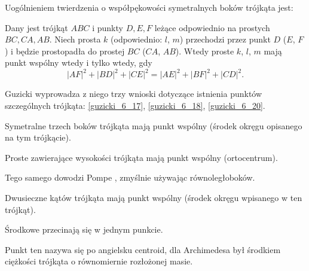 %

Uogólnieniem twierdzenia o współpękowości symetralnych boków trójkąta jest:

\begin{proposition}
\label{guzicki_6_13}%
	Dany jest trójkąt $ABC$ i punkty $D, E, F$ leżące odpowiednio na prostych $BC, CA, AB$.
	Niech prosta $k$ (odpowiednio: $l$, $m$) przechodzi przez punkt $D$ ($E$, $F$) i będzie prostopadła do prostej $BC$ ($CA$, $AB$).
	Wtedy proste $k$, $l$, $m$ mają punkt wspólny wtedy i tylko wtedy, gdy
	\begin{equation}
		|AF|^2 + |BD|^2 + |CE|^2 = |AE|^2 + |BF|^2 + |CD|^2.
	\end{equation}
\end{proposition}

Guzicki \cite[s. 176]{guzicki_2021} wyprowadza z niego trzy wnioski dotyczące istnienia punktów szczególnych trójkąta: \ref{guzicki_6_17}, \ref{guzicki_6_18}, \ref{guzicki_6_20}.

\begin{corollary}
\label{guzicki_6_17}%
    Symetralne trzech boków trójkąta mają punkt wspólny (środek okręgu opisanego na tym trójkącie).
\end{corollary}

\begin{corollary}
\label{guzicki_6_18}%
    Proste zawierające wysokości trójkąta mają punkt wspólny (ortocentrum).
%
\end{corollary}

Tego samego dowodzi Pompe \cite[s. 38]{pompe_2022}, zmyślnie używając równoległoboków.

\begin{corollary}
\label{guzicki_6_20}%
    Dwusieczne kątów trójkąta mają punkt wspólny (środek okręgu wpisanego w ten trójkąt).
\end{corollary}

Środkowe przecinają się w jednym punkcie. %

Punkt ten nazywa się po angielsku centroid, dla Archimedesa był środkiem ciężkości trójkąta o równomiernie rozłożonej masie.

%